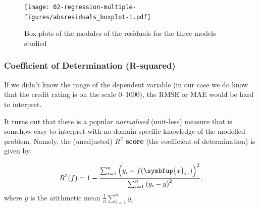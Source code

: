 \documentclass[10pt,b5paper,krantz1]{krantz}
\newenvironment{Shaded}{\begin{snugshade}}{\end{snugshade}}
\newcommand{\DataTypeTok}[1]{\textcolor[rgb]{0.27,0.27,0.27}{#1}}
\newcommand{\DecValTok}[1]{\textcolor[rgb]{0.06,0.06,0.06}{#1}}
\newcommand{\KeywordTok}[1]{\textcolor[rgb]{0.27,0.27,0.27}{\textbf{#1}}}
\newcommand{\NormalTok}[1]{#1}
\newcommand{\OperatorTok}[1]{\textcolor[rgb]{0.43,0.43,0.43}{\textbf{#1}}}
\newcommand{\OtherTok}[1]{\textcolor[rgb]{0.37,0.37,0.37}{#1}}
\newcommand{\StringTok}[1]{\textcolor[rgb]{0.5,0.5,0.5}{#1}}
\renewcommand{\mathbf}[1]{\symbfup{#1}}
\begin{document}
\begin{Shaded}
\end{Shaded}

\begin{figure}
\hypertarget{fig:absresiduals_boxplot}{%
\centering
\texttt{[image: 02-regression-multiple-figures/absresiduals\_boxplot-1.pdf]}
\caption{Box plots of the modules of the residuals for the three models studied}\label{fig:absresiduals_boxplot}
}
\end{figure}

\hypertarget{coefficient-of-determination-r-squared}{%
\subsubsection{Coefficient of Determination (R-squared)}\label{coefficient-of-determination-r-squared}}

If we didn't know the range of the dependent variable
(in our case we do know that the credit rating is on the scale 0--1000),
the RMSE or MAE would be hard to interpret.

It turns out that there is a popular \emph{normalised} (unit-less) measure
that is somehow easy to interpret with no domain-specific knowledge
of the modelled problem.
Namely, the (unadjusted) \textbf{\(R^2\) score} (the coefficient of determination)
is given by:

\[
R^2(f) = 1 - \frac{\sum_{i=1}^{n} \left(y_i-f(\mathbf{x}_{i,\cdot})\right)^2}{\sum_{i=1}^{n} \left(y_i-\bar{y}\right)^2},
\]
where \(\bar{y}\) is the arithmetic mean \(\frac{1}{n}\sum_{i=1}^n y_i\).

\begin{Shaded}
\end{Shaded}
\end{document}
